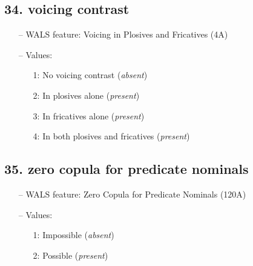 \subsection*{34. voicing contrast}

\begin{itemize}
  \item[--] WALS feature: Voicing in Plosives and Fricatives (4A)
  \item[--] Values:
  {\small
  \begin{enumerate}
    \item[1:] No voicing contrast (\emph{absent})
    \item[2:] In plosives alone (\emph{present})
    \item[3:] In fricatives alone (\emph{present})
    \item[4:] In both plosives and fricatives (\emph{present})
  \end{enumerate}
  }
\end{itemize}


\subsection*{35. zero copula for predicate nominals}

\begin{itemize}
  \item[--] WALS feature: Zero Copula for Predicate Nominals (120A)
  \item[--] Values:
  {\small
  \begin{enumerate}
    \item[1:] Impossible (\emph{absent})
    \item[2:] Possible (\emph{present})
  \end{enumerate}
  }
\end{itemize}


